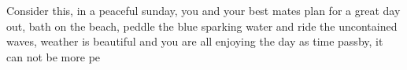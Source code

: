 Consider this, in a peaceful sunday, you and your best mates plan for a great day out, bath on the beach, peddle the blue sparking water and ride the uncontained waves, weather is beautiful and you are all enjoying the day as time passby, it can not be more pe